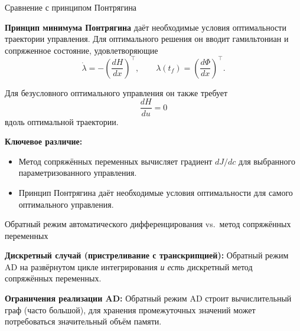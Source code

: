 \documentclass{beamer}
\begin{document}
	\begin{frame}{Сравнение с принципом Понтрягина}
		\begin{flushleft}
			
			\textbf{Принцип минимума Понтрягина} даёт необходимые
			условия оптимальности траектории управления. Для оптимального решения он вводит гамильтониан
			и сопряженное состояние, удовлетворяющие
			\[
			\dot{\lambda}=-\left(\frac{dH}{dx}\right)^\top,
			\qquad
			\lambda(t_f)=\left(\frac{d\Phi}{dx}\right)^\top.
			\]
			
			Для безусловного оптимального управления он также требует
			\[
			\frac{dH}{du}=0
			\]
			вдоль оптимальной траектории.
			
			\textbf{Ключевое различие:}
			\begin{itemize}
				\item Метод сопряжённых переменных вычисляет градиент
				$dJ/dc$ для выбранного параметризованного управления.
				\item Принцип Понтрягина даёт необходимые
				условия оптимальности для самого оптимального управления.
			\end{itemize}
			
		\end{flushleft}
	\end{frame}
	
	
	
	\begin{frame}{Обратный режим автоматического дифференцирования vs.\ метод сопряжённых переменных}
		\begin{flushleft}
			
			\textbf{Дискретный случай (пристреливание с транскрипцией):} Обратный режим AD на развёрнутом цикле интегрирования
			\emph{и есть} дискретный метод сопряжённых переменных.
			
			\bigskip
			
			\textbf{Ограничения реализации AD:} Обратный режим AD строит вычислительный граф (часто большой), для хранения промежуточных значений может потребоваться значительный объём памяти.
			
		\end{flushleft}
	\end{frame}
	
	
	
\end{document}
